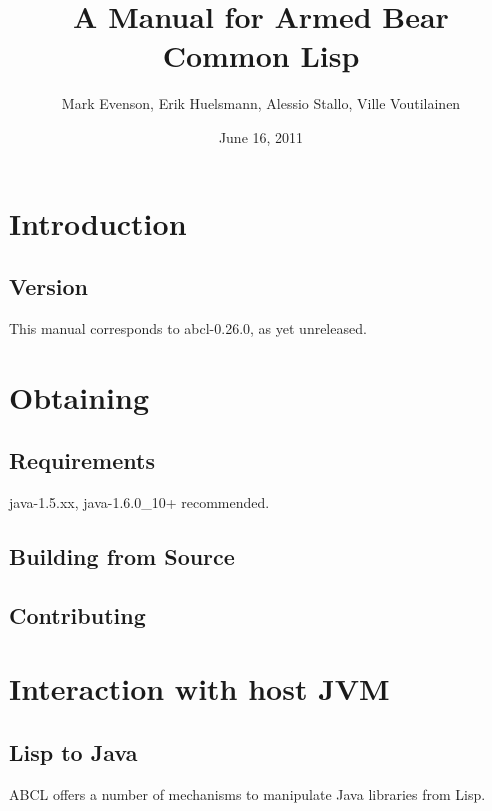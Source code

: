 \documentclass[10pt]{article}
\begin{document}
\title{A Manual for Armed Bear Common Lisp}
\date{June 16, 2011}
\author{Mark Evenson, Erik Huelsmann, Alessio Stallo, Ville Voutilainen}

\section{Introduction}
\subsection{Version}

This manual corresponds to abcl-0.26.0, as yet unreleased.

\section{Obtaining}

\subsection{Requirements}

java-1.5.xx, java-1.6.0_10+ recommended.

\subsection{Building from Source}

\subsection{Contributing}

\section{Interaction with host JVM}


\subsection{Lisp to Java}

ABCL offers a number of mechanisms to manipulate Java libraries from
Lisp.
\end{document}
